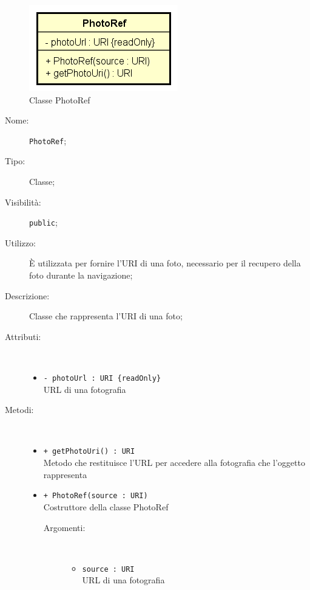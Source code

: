 \documentclass[../DefinizioneDiProdotto.tex]{subfiles}
\begin{document}
    \begin{figure}[H]
        \centering
        \includegraphics{img/PhotoRef.png}
        \caption{Classe PhotoRef}\label{fig:model::navigator::graph::navigationinformation::PhotoRef} 
    \end{figure}
    \begin{description}
\item[Nome:] \texttt{PhotoRef};
\item[Tipo:] Classe;
\item[Visibilità:] \texttt{public};
\item[Utilizzo:] È utilizzata per fornire l'URI di una foto, necessario per il recupero della foto durante la navigazione;
\item[Descrizione:] Classe che rappresenta l'URI di una foto;
\item[Attributi:] \
\begin{itemize}
\item \texttt{- photoUrl : URI \{readOnly\}}\\
URL di una fotografia

\end{itemize}
\item[Metodi:] \
\begin{itemize}
\item \texttt{+ getPhotoUri() : URI}\\
Metodo che restituisce l'URL per accedere alla fotografia che l'oggetto rappresenta
 \item \texttt{+ PhotoRef(source : URI)}\\
Costruttore della classe PhotoRef
 \begin{description}
\item[Argomenti:] \
\begin{itemize}
\item \texttt{source : URI}\\
URL di una fotografia\end{itemize}
\end{description}
\end{itemize}
\end{description}
\end{document}
